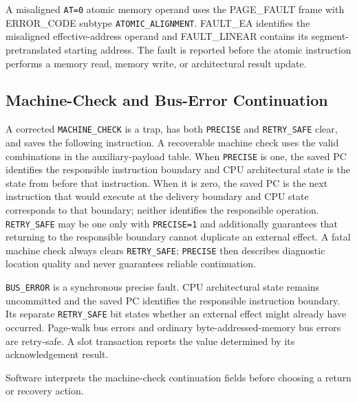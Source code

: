 A misaligned \texttt{AT=0} atomic memory operand uses the PAGE\_FAULT frame with ERROR\_CODE subtype
\texttt{ATOMIC\_ALIGNMENT}. FAULT\_EA identifies the misaligned effective-address operand and FAULT\_LINEAR contains
its segment-pretranslated starting address. The fault is reported before the atomic instruction performs a memory
read, memory write, or architectural result update.





\subsection{Machine-Check and Bus-Error Continuation}
A corrected \texttt{MACHINE\_CHECK} is a trap, has both \texttt{PRECISE} and \texttt{RETRY\_SAFE} clear, and saves
the following instruction. A recoverable machine check uses the valid combinations in the auxiliary-payload table.
When \texttt{PRECISE} is one, the saved PC identifies the responsible instruction boundary and CPU architectural
state is the state from before that instruction. When it is zero, the saved PC is the next instruction that would
execute at the delivery boundary and CPU state corresponds to that boundary; neither identifies the responsible
operation. \texttt{RETRY\_SAFE} may be one only with \texttt{PRECISE=1} and additionally guarantees that returning
to the responsible boundary cannot duplicate an external effect. A fatal machine check always clears
\texttt{RETRY\_SAFE}; \texttt{PRECISE} then describes diagnostic location quality and never guarantees reliable
continuation.

\texttt{BUS\_ERROR} is a synchronous precise fault. CPU architectural state remains uncommitted and the saved PC
identifies the responsible instruction boundary. Its separate \texttt{RETRY\_SAFE} bit states whether an external
effect might already have occurred. Page-walk bus errors and ordinary byte-addressed-memory bus errors are retry-safe.
A slot transaction reports the value determined by its acknowledgement result.

Software interprets the machine-check continuation fields before choosing a return or recovery action.

\Needspace{6.4in}
